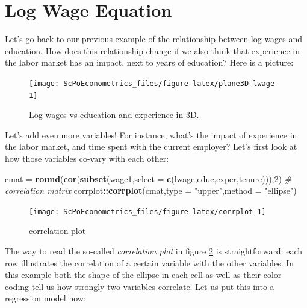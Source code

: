 \documentclass[]{book}
\newenvironment{Shaded}{\begin{snugshade}}{\end{snugshade}}
\newcommand{\CommentTok}[1]{\textcolor[rgb]{0.56,0.35,0.01}{\textit{#1}}}
\newcommand{\DataTypeTok}[1]{\textcolor[rgb]{0.13,0.29,0.53}{#1}}
\newcommand{\DecValTok}[1]{\textcolor[rgb]{0.00,0.00,0.81}{#1}}
\newcommand{\KeywordTok}[1]{\textcolor[rgb]{0.13,0.29,0.53}{\textbf{#1}}}
\newcommand{\NormalTok}[1]{#1}
\newcommand{\OperatorTok}[1]{\textcolor[rgb]{0.81,0.36,0.00}{\textbf{#1}}}
\newcommand{\StringTok}[1]{\textcolor[rgb]{0.31,0.60,0.02}{#1}}
\begin{document}
\hypertarget{log-wage-equation}{%
\section{Log Wage Equation}\label{log-wage-equation}}

Let's go back to our previous example of the relationship between log wages and education. How does this relationship change if we also think that experience in the labor market has an impact, next to years of education? Here is a picture:

\begin{figure}

{\centering \texttt{[image: ScPoEconometrics\_files/figure-latex/plane3D-lwage-1]} 

}

\caption{Log wages vs education and experience in 3D.}\label{fig:plane3D-lwage}
\end{figure}

Let's add even more variables! For instance, what's the impact of experience in the labor market, and time spent with the current employer? Let's first look at how those variables co-vary with each other:

\begin{Shaded}
\begin{Highlighting}[]
\NormalTok{cmat =}\StringTok{ }\KeywordTok{round}\NormalTok{(}\KeywordTok{cor}\NormalTok{(}\KeywordTok{subset}\NormalTok{(wage1,}\DataTypeTok{select =} \KeywordTok{c}\NormalTok{(lwage,educ,exper,tenure))),}\DecValTok{2}\NormalTok{) }\CommentTok{# correlation matrix}
\NormalTok{corrplot}\OperatorTok{::}\KeywordTok{corrplot}\NormalTok{(cmat,}\DataTypeTok{type =} \StringTok{"upper"}\NormalTok{,}\DataTypeTok{method =} \StringTok{"ellipse"}\NormalTok{)}
\end{Highlighting}
\end{Shaded}

\begin{figure}

{\centering \texttt{[image: ScPoEconometrics\_files/figure-latex/corrplot-1]} 

}

\caption{correlation plot}\label{fig:corrplot}
\end{figure}

The way to read the so-called \emph{correlation plot} in figure \ref{fig:corrplot} is straightforward: each row illustrates the correlation of a certain variable with the other variables. In this example both the shape of the ellipse in each cell as well as their color coding tell us how strongly two variables correlate. Let us put this into a regression model now:
\end{document}
